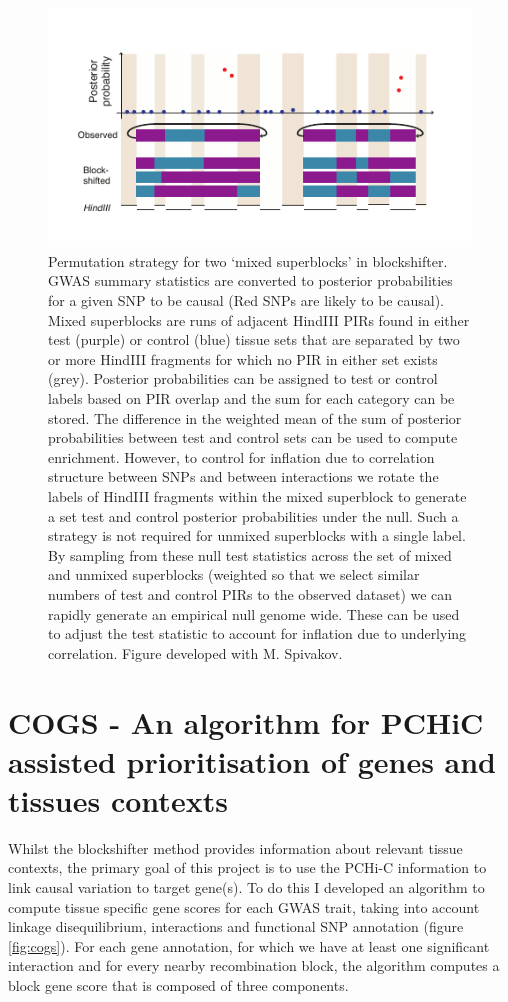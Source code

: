 \documentclass[a4paper,11pt]{report}
\begin{document}
\begin{figure}[h]

\includegraphics[width=\textwidth]{blockshifter.pdf}
\caption{Permutation strategy for two `mixed superblocks' in blockshifter. GWAS
summary statistics are converted to posterior probabilities for a given
SNP to be causal (Red SNPs are likely to be causal). Mixed superblocks
are runs of adjacent HindIII PIRs  found in either test (purple) or
control (blue) tissue sets that are separated by two or more HindIII
fragments for which no PIR in either set exists (grey). Posterior
probabilities can be assigned to test or control labels based on PIR
overlap and the sum for each category can be stored. The difference in
the weighted mean of the sum of posterior probabilities between test and
control sets can be used to compute enrichment.  However, to control for
inflation due to correlation structure between SNPs and between
interactions we rotate the labels of HindIII fragments within the mixed
superblock to generate a set test and control posterior probabilities
under the null. Such a strategy is not required for unmixed superblocks
with a single label.  By sampling from these null test statistics across
the set of mixed and unmixed superblocks (weighted so that we select
similar numbers of test and control PIRs to the observed dataset)  we
can rapidly generate an empirical null genome wide. These can be used to
adjust the test statistic to account for inflation due to underlying
correlation. Figure developed with M. Spivakov. }
\label{fig:blockshifter}
\centering
\end{figure}

\section{COGS - An algorithm for PCHiC assisted prioritisation of genes and tissues contexts}
\label{sect:COGS}
Whilst the blockshifter method provides information about relevant tissue contexts, the primary goal of this project is to use the PCHi-C information to link causal variation to target gene(s). To do this
I developed an algorithm to compute tissue specific gene scores for each GWAS trait, taking into account linkage disequilibrium, interactions and functional SNP annotation (figure \ref{fig:cogs}). For each gene annotation, for which we have at least one significant interaction and for every nearby recombination block, the algorithm computes a block gene score that is composed of three components.
\end{document}
